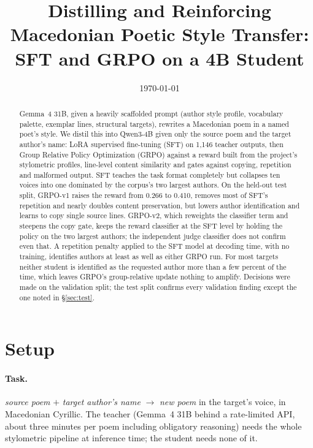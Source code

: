 \documentclass[11pt]{article}
\title{Distilling and Reinforcing Macedonian Poetic Style Transfer:\\
SFT and GRPO on a 4B Student}
\date{\today}
\begin{document}
\maketitle

\begin{abstract}
Gemma~4 31B, given a heavily scaffolded prompt (author style profile,
vocabulary palette, exemplar lines, structural targets), rewrites a Macedonian
poem in a named poet's style. We distil this into Qwen3-4B given only the
source poem and the target author's name: LoRA supervised fine-tuning (SFT) on
1{,}146 teacher outputs, then Group Relative Policy Optimization (GRPO) against
a reward built from the project's stylometric profiles, line-level content
similarity and gates against copying, repetition and malformed output. SFT
teaches the task format completely but collapses ten voices into one dominated
by the corpus's two largest authors. On the held-out test split, GRPO-v1
raises the reward from 0.266 to 0.410, removes most of SFT's repetition and
nearly doubles content preservation, but lowers author identification and
learns to copy single source lines. GRPO-v2, which reweights the classifier
term and steepens the copy gate, keeps the reward classifier at the SFT level
by holding the policy on the two largest authors; the independent judge
classifier does not confirm even that. A repetition penalty applied to the SFT
model at decoding time, with no training, identifies authors at least as well
as either GRPO run. For most targets neither student is identified as the
requested author more than a few percent of the time, which leaves GRPO's
group-relative update nothing to amplify. Decisions were made on the
validation split; the test split confirms every validation finding except the
one noted in \S\ref{sec:test}.
\end{abstract}

\section{Setup}\label{sec:setup}

\paragraph{Task.} \emph{source poem} $+$ \emph{target author's name}
$\to$ \emph{new poem} in the target's voice, in Macedonian Cyrillic. The
teacher (Gemma~4 31B behind a rate-limited API, about three minutes per poem
including obligatory reasoning) needs the whole stylometric pipeline at
inference time; the student needs none of it.
\end{document}
